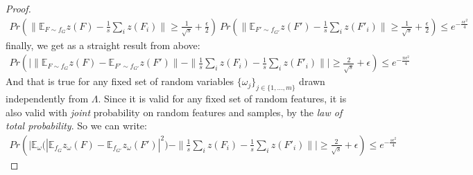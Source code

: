 \begin{proof}
\begin{align*}
    Pr( \| \mathbb{E}_{F \sim f_G} z(F) -  \frac{1}{{s}} \sum_i z(F_i) \| \geq \frac{1}{\sqrt{{s}}}+\frac{\epsilon}{2})~Pr( \|\mathbb{E}_{F' \sim f_{G'}} z(F') - \frac{1}{{s}} \sum_i z(F'_i)\|\geq\frac{1}{\sqrt{{s}}}+\frac{\epsilon}{2})\leq 
    e^{-\frac{{s}\epsilon^2}{4}}
\end{align*}
finally, we get as a straight result from above:
\begin{align*}
    Pr(\Big | \| \mathbb{E}_{F \sim f_G} z(F) - \mathbb{E}_{F' \sim f_{G'}} z(F')\| - \| \frac{1}{{s}} \sum_i z(F_i) - \frac{1}{{s}} \sum_i z(F'_i)\|\Big | \geq
    \frac{2}{\sqrt{{s}}}+\epsilon)\leq e^{-\frac{n\epsilon^2}{4}}
\end{align*}
And that is true for any fixed set of random variables  $\{\omega_j\}_{j \in \{1,\ldots, m\}}$ drawn independently from $\Lambda$.
Since it is valid for any fixed set of random features, it is also valid with \emph{joint} probability on random features and samples, by the \emph{law of total probability}. So we can write:
\begin{align*}
    Pr(\Big | \mathbb{E}_{\omega} \Big( | \mathbb{E}_{f_G} z_\omega(F) - \mathbb{E}_{f_{G'}} z_\omega(F') |^2 \Big) - \| \frac{1}{s} \sum_i z(F_i) - \frac{1}{s} \sum_i z(F'_i)\|\Big | \geq
    \frac{2}{\sqrt{s}}+\epsilon)\leq e^{-\frac{s\epsilon^2}{4}}
\end{align*}

\end{proof}



